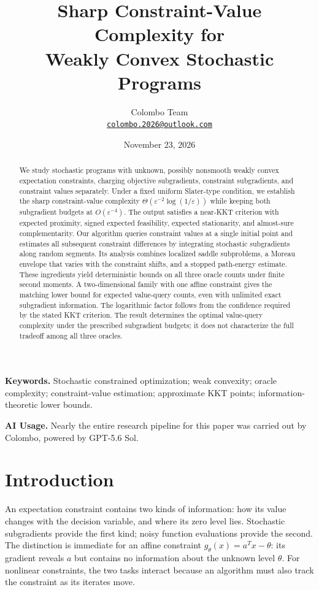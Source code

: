 \documentclass[11pt,a4paper]{article}
\title{Sharp Constraint-Value Complexity for\\Weakly Convex Stochastic Programs}
\author{Colombo Team\\[0.25em]
  \small\href{mailto:colombo.2026@outlook.com}{\texttt{colombo.2026@outlook.com}}}
\date{November 23, 2026}
\newcommand{\eps}{\varepsilon}
\theoremstyle{remark}
\numberwithin{equation}{section}
\begin{document}
\maketitle
\begin{abstract}
We study stochastic programs with unknown, possibly nonsmooth weakly convex expectation constraints, charging objective subgradients, constraint subgradients, and constraint values separately. Under a fixed uniform Slater-type condition, we establish the sharp constraint-value complexity
$\Theta(\eps^{-2}\log(1/\eps))$ while keeping both subgradient budgets at $O(\eps^{-4})$.
The output satisfies a near-KKT criterion with expected proximity, signed expected feasibility, expected stationarity, and almost-sure complementarity. Our algorithm queries constraint values at a single initial point and estimates all subsequent constraint differences by integrating stochastic subgradients along random segments. Its analysis combines localized saddle subproblems, a Moreau envelope that varies with the constraint shifts, and a stopped path-energy estimate. These ingredients yield deterministic bounds on all three oracle counts under finite second moments. A two-dimensional family with one affine constraint gives the matching lower bound for expected value-query counts, even with unlimited exact subgradient information. The logarithmic factor follows from the confidence required by the stated KKT criterion. The result determines the optimal value-query complexity under the prescribed subgradient budgets; it does not characterize the full tradeoff among all three oracles.
\end{abstract}

\noindent\textbf{Keywords.} Stochastic constrained optimization; weak convexity; oracle complexity; constraint-value estimation; approximate KKT points; information-theoretic lower bounds.

\begin{samepage}
\noindent\textbf{AI Usage.}
Nearly the entire research pipeline for this paper was carried out by
Colombo, powered by GPT-5.6 Sol.
\par
\end{samepage}

\section{Introduction}\label{sec:introduction}
An expectation constraint contains two kinds of information: how its value changes with the decision variable, and where its zero level lies. Stochastic subgradients provide the first kind; noisy function evaluations provide the second. The distinction is immediate for an affine constraint $g_\theta(x)=a^Tx-\theta$: its gradient reveals $a$ but contains no information about the unknown level $\theta$. For nonlinear constraints, the two tasks interact because an algorithm must also track the constraint as its iterates move.
\end{document}
